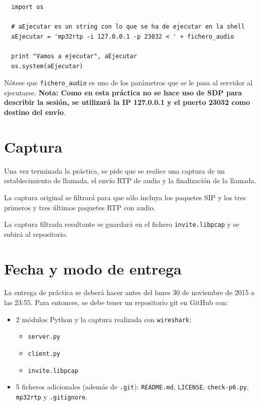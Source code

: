 \documentclass[a4paper,11pt]{article}
\begin{document}
\begin{verbatim}
  import os

  # aEjecutar es un string con lo que se ha de ejecutar en la shell
  aEjecutar = 'mp32rtp -i 127.0.0.1 -p 23032 < ' + fichero_audio 

  print "Vamos a ejecutar", aEjecutar
  os.system(aEjecutar)
\end{verbatim}

Nótese que \texttt{fichero\_audio} es uno de los parámetros que se le pasa al servidor al ejecutarse. {\bf Nota: Como en esta práctica no se hace uso de SDP para 
describir la sesión, se utilizará la IP 127.0.0.1 y el puerto 23032 como
destino del envío}.

\section*{Captura}

Una vez terminada la práctica, se pide que se realice una captura de un
establecimiento de llamada, el envío RTP de audio y la finalización de
la llamada. 

La captura original se filtrará para que sólo incluya los paquetes
SIP y los tres primeros y tres últimos paquetes RTP con audio.

La captura filtrada resultante se guardará en el fichero \texttt{invite.libpcap}
y se subirá al repositorio.


\section*{Fecha y modo de entrega}

La entrega de práctica se deberá hacer antes del lunes 30 de noviembre de 2015 a las 23:55. Para entonces, se debe tener un repositorio git en GitHub con: 

    \begin{itemize}
        \item 2 módulos Python y la captura realizada con \texttt{wireshark}:
    \begin{itemize}
      \item \texttt{server.py}
      \item \texttt{client.py}
      \item \texttt{invite.libpcap}
    \end{itemize}
    \item 5 ficheros adicionales (además de \texttt{.git}): \texttt{README.md}, \texttt{LICENSE}, \texttt{check-p6.py}, \texttt{mp32rtp} y \texttt{.gitignore}.
\end{itemize}
\end{document}
